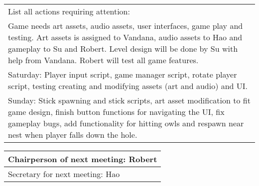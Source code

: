 \documentclass{article}
\begin{document}
\begin{table}[H]
	\centering
	\begin{tabular}{| p{12cm}  |}
	\hline
	List all actions requiring attention:\\ Game needs art assets, audio assets, user interfaces, game play and testing. Art assets is assigned to Vandana, audio assets to Hao and gameplay to Su and Robert. Level design will be done by Su with help from Vandana. Robert will test all game features.\\ \hline
	Saturday: Player input script, game manager script, rotate player script, testing creating and modifying assets (art and audio) and UI.\\ \hline
	Sunday: Stick spawning and stick scripts, art asset modification to fit game design, finish button functions for navigating the UI, fix gameplay bugs, add functionality for hitting owls and respawn near nest when player falls down the hole.\\ \hline 
\end{tabular}
\end{table}

\begin{table}[H]
	\centering
	\begin{tabular}{| p{12cm}  |}
	\hline
	Chairperson of next meeting: Robert\\ \hline
	Secretary for next meeting: Hao\\ \hline
\end{tabular}
\end{table}
\end{document}
